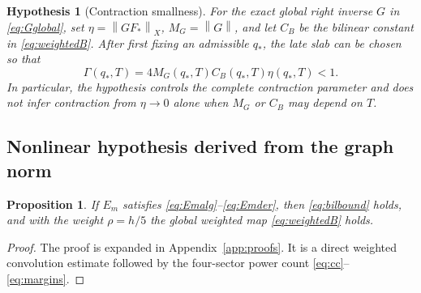 \documentclass[11pt]{article}
\newtheorem{proposition}[theorem]{Proposition}
\newtheorem{hypothesis}[theorem]{Hypothesis}
\numberwithin{equation}{section}
\newcommand{\norm}[1]{\left\lVert #1\right\rVert}
\begin{document}
\begin{hypothesis}[Contraction smallness]\label{hyp:eta}
For the exact global right inverse \(G\) in \eqref{eq:Gglobal}, set \(\eta=\norm{GF_*}_X\), \(M_G=\norm G\), and let \(C_B\) be the bilinear constant in \eqref{eq:weightedB}.  After first fixing an admissible \(q_*\), the late slab can be chosen so that
\[
\Gamma(q_*,T)=4M_G(q_*,T)C_B(q_*,T)\eta(q_*,T)<1.
\]
In particular, the hypothesis controls the complete contraction parameter and does not infer contraction from \(\eta\to0\) alone when \(M_G\) or \(C_B\) may depend on \(T\).
\end{hypothesis}

\subsection{Nonlinear hypothesis derived from the graph norm}
\begin{proposition}\label{prop:Bappendix}
If \(E_m\) satisfies \eqref{eq:Emalg}--\eqref{eq:Emder}, then \eqref{eq:bilbound} holds, and with the weight \(\rho=h/5\) the global weighted map \eqref{eq:weightedB} holds.
\end{proposition}
\begin{proof}
The proof is expanded in Appendix~\ref{app:proofs}.  It is a direct weighted convolution estimate followed by the four-sector power count \eqref{eq:cc}--\eqref{eq:margins}.
\end{proof}
\end{document}
